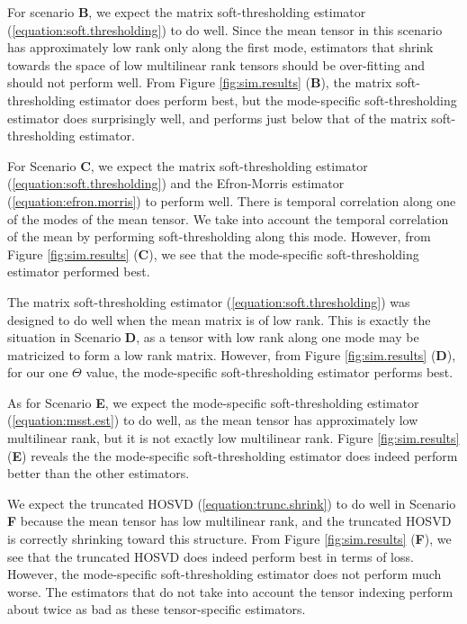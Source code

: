 For scenario \textbf{B}, we expect the matrix soft-thresholding
estimator (\ref{equation:soft.thresholding}) to do well. Since the
mean tensor in this scenario has approximately low rank only along the
first mode, estimators that shrink towards the space of low
multilinear rank tensors should be over-fitting and should not perform
well. From Figure \ref{fig:sim.results} (\textbf{B}), the matrix
soft-thresholding estimator does perform best, but the mode-specific
soft-thresholding estimator does surprisingly well, and performs just
below that of the matrix soft-thresholding estimator.

For Scenario \textbf{C}, we expect the matrix soft-thresholding
estimator (\ref{equation:soft.thresholding}) and the Efron-Morris
estimator (\ref{equation:efron.morris}) to perform well. There is
temporal correlation along one of the modes of the mean tensor. We
take into account the temporal correlation of the mean by performing
soft-thresholding along this mode. However, from Figure
\ref{fig:sim.results} (\textbf{C}), we see that the mode-specific
soft-thresholding estimator performed best.

The matrix soft-thresholding estimator
(\ref{equation:soft.thresholding}) was designed to do well when the
mean matrix is of low rank. This is exactly the situation in Scenario
\textbf{D}, as a tensor with low rank along one mode may be matricized
to form a low rank matrix. However, from Figure \ref{fig:sim.results}
(\textbf{D}), for our one $\Theta$ value, the mode-specific
soft-thresholding estimator performs best.

As for Scenario \textbf{E}, we expect the mode-specific
soft-thresholding estimator (\ref{equation:msst.est}) to do well, as
the mean tensor has approximately low multilinear rank, but it is not
exactly low multilinear rank. Figure \ref{fig:sim.results}
(\textbf{E}) reveals the the mode-specific soft-thresholding estimator
does indeed perform better than the other estimators.

We expect the truncated HOSVD (\ref{equation:trunc.shrink}) to do well
in Scenario \textbf{F} because the mean tensor has low multilinear
rank, and the truncated HOSVD is correctly shrinking toward this
structure. From Figure \ref{fig:sim.results} (\textbf{F}), we see that
the truncated HOSVD does indeed perform best in terms of
loss. However, the mode-specific soft-thresholding estimator does not
perform much worse. The estimators that do not take into account the
tensor indexing perform about twice as bad as these tensor-specific
estimators.

